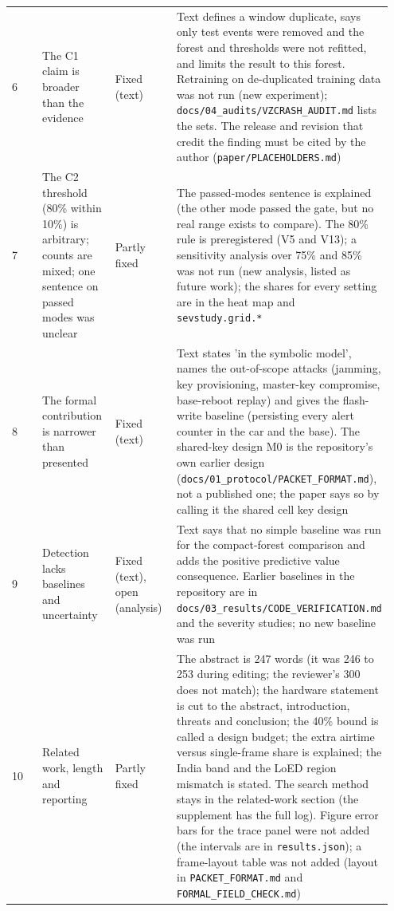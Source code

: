 {\begin{longtable}{p{0.237\linewidth}p{0.237\linewidth}p{0.237\linewidth}p{0.237\linewidth}}
6 & The C1 claim is broader than the evidence & Fixed (text) & Text defines a window duplicate, says only test events were removed and the forest and thresholds were not refitted, and limits the result to this forest. Retraining on de-duplicated training data was not run (new experiment); \texttt{docs/04\_audits/VZCRASH\_AUDIT.md} lists the sets. The release and revision that credit the finding must be cited by the author (\texttt{paper/PLACEHOLDERS.md}) \\
7 & The C2 threshold (80\% within 10\%) is arbitrary; counts are mixed; one sentence on passed modes was unclear & Partly fixed & The passed-modes sentence is explained (the other mode passed the gate, but no real range exists to compare). The 80\% rule is preregistered (V5 and V13); a sensitivity analysis over 75\% and 85\% was not run (new analysis, listed as future work); the shares for every setting are in the heat map and \texttt{sevstudy.grid.*} \\
8 & The formal contribution is narrower than presented & Fixed (text) & Text states 'in the symbolic model', names the out-of-scope attacks (jamming, key provisioning, master-key compromise, base-reboot replay) and gives the flash-write baseline (persisting every alert counter in the car and the base). The shared-key design M0 is the repository's own earlier design (\texttt{docs/01\_protocol/PACKET\_FORMAT.md}), not a published one; the paper says so by calling it the shared cell key design \\
9 & Detection lacks baselines and uncertainty & Fixed (text), open (analysis) & Text says that no simple baseline was run for the compact-forest comparison and adds the positive predictive value consequence. Earlier baselines in the repository are in \texttt{docs/03\_results/CODE\_VERIFICATION.md} and the severity studies; no new baseline was run \\
10 & Related work, length and reporting & Partly fixed & The abstract is 247 words (it was 246 to 253 during editing; the reviewer's 300 does not match); the hardware statement is cut to the abstract, introduction, threats and conclusion; the 40\% bound is called a design budget; the extra airtime versus single-frame share is explained; the India band and the LoED region mismatch is stated. The search method stays in the related-work section (the supplement has the full log). Figure error bars for the trace panel were not added (the intervals are in \texttt{results.json}); a frame-layout table was not added (layout in \texttt{PACKET\_FORMAT.md} and \texttt{FORMAL\_FIELD\_CHECK.md}) \\
\bottomrule
\end{longtable}}


